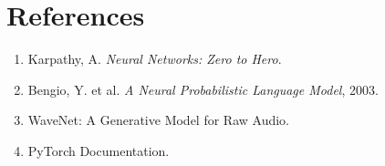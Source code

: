 \documentclass[11pt,a4paper]{article}
\begin{document}
\section*{References}

\begin{enumerate}
    \item Karpathy, A. \emph{Neural Networks: Zero to Hero}.
    \item Bengio, Y. et al. \emph{A Neural Probabilistic Language Model}, 2003.
    \item WaveNet: A Generative Model for Raw Audio.
    \item PyTorch Documentation.
\end{enumerate}
\end{document}
